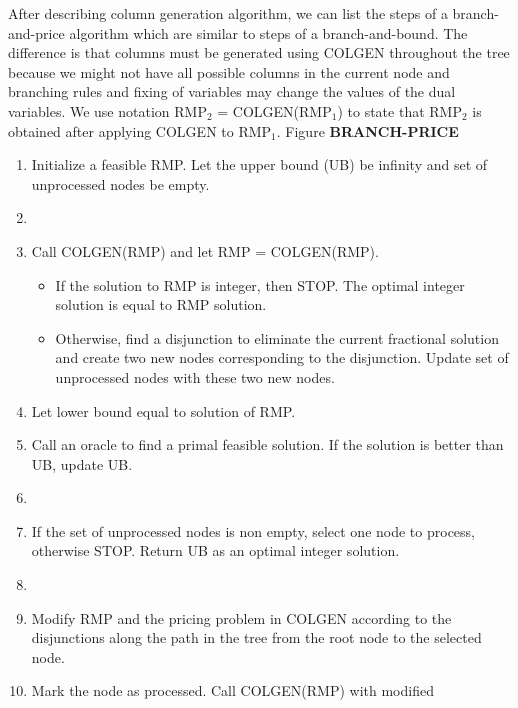After describing column generation algorithm, we can list the steps of a 
branch-and-price algorithm which are similar to steps of a branch-and-bound.
The difference is that columns must be generated using COLGEN throughout the 
tree because we might not have all possible columns in the current node and branching 
rules and fixing of variables may change the values of the dual variables. 
We use notation RMP$_2$ = COLGEN(RMP$_1$) to state that RMP$_2$ is
obtained after applying COLGEN to RMP$_1$. Figure 
{\bf BRANCH-PRICE}
\begin {enumerate}
\item[0.] Initialize a feasible RMP. Let the upper bound (UB) 
  be infinity and set of unprocessed nodes be empty.
  \item[] 
\item[1.] Call COLGEN(RMP) and let RMP =  COLGEN(RMP). 
  \begin{itemize}
  \item[i.] If the solution to RMP is integer, then STOP. The optimal
    integer solution is equal to RMP solution.
  \item[ii.] Otherwise, find a disjunction to eliminate the current fractional
    solution and create two new nodes corresponding to the disjunction. 
    Update set of unprocessed nodes with these two new nodes.
  \end{itemize}
\item [2.] Let lower bound equal to solution of RMP.
\item [3.] Call an oracle to find a primal feasible solution. If the
  solution is better than UB, update UB. 
 \item[] 
\item [4.] If the set of unprocessed nodes is non empty, select one node
  to process, otherwise STOP. Return UB as an optimal integer solution.
 \item[]  
\item [5.] Modify RMP and the pricing problem in COLGEN according to the 
  disjunctions along the path in the tree from the root node to the 
  selected node. 
\item[6.]  Mark the node as processed. Call COLGEN(RMP) with modified 

\end{enumerate}
